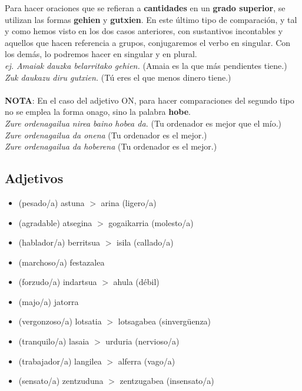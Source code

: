 \documentclass[11pt, a4paper]{article}
\begin{document}
\noindent Para hacer oraciones que se refieran a \textbf{cantidades}  en un \textbf{grado superior}, se utilizan las formas \textbf{gehien} y \textbf{gutxien}. En este último tipo de comparación, y tal y como hemos visto en los dos casos anteriores, con sustantivos incontables y aquellos que hacen referencia a grupos, conjugaremos el verbo en singular. Con los demás, lo podremos hacer en singular y en plural.\\
\indent \textit{ej. Amaiak dauzka belarritako gehien.}
(Amaia es la que más pendientes tiene.)\\
\indent \textit{Zuk daukazu diru gutxien.}
(Tú eres el que menos dinero tiene.)\\ \\

\noindent \textbf{NOTA}:
En el caso del adjetivo ON, para hacer comparaciones del segundo tipo no se emplea la forma onago, sino la palabra \textbf{hobe}.\\
\indent \textit{Zure ordenagailua nirea baino hobea da.}
(Tu ordenador es mejor que el mío.)\\
\indent \textit{Zure ordenagailua da onena}
(Tu ordenador es el mejor.)\\
\indent \textit{Zure ordenagailua da hoberena}
(Tu ordenador es el mejor.)

\subsection{Adjetivos}
\begin{itemize}
\item (pesado/a) astuna $>$ arina (ligero/a)
\item (agradable) atsegina $>$ gogaikarria (molesto/a)
\item (hablador/a) berritsua $>$ isila (callado/a)
\item (marchoso/a) festazalea
\item (forzudo/a) indartsua $>$ ahula (débil)
\item (majo/a) jatorra
\item (vergonzoso/a) lotsatia $>$ lotsagabea (sinvergüenza)
\item (tranquilo/a) lasaia $>$ urduria (nervioso/a)
\item (trabajador/a) langilea $>$ alferra (vago/a)
\item (sensato/a) zentzuduna $>$ zentzugabea (insensato/a)
\end{itemize}
\end{document}
